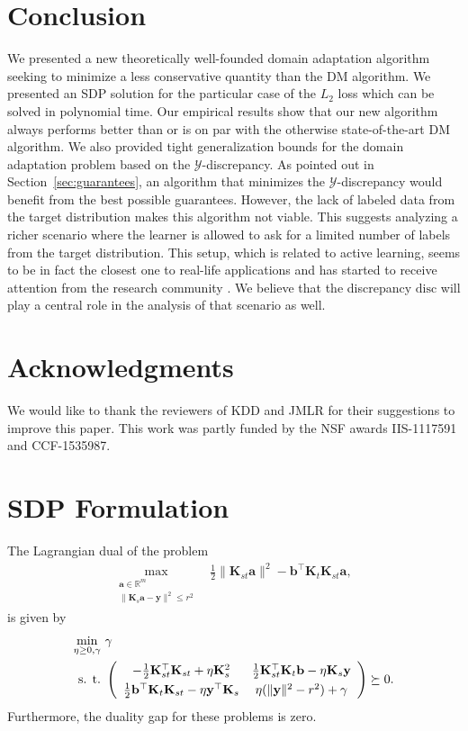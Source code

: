 \documentclass[twoside,11pt]{article}
\def\Rset{\mathbb{R}}
\newcommand{\cY}{{\mathcal Y}}
\newcommand{\mat}[1]{{\mathbf #1}}
\renewcommand{\a}{\mat{a}}
\renewcommand{\b}{\mat{b}}
\newcommand{\1}{\mat{1}}
\newcommand{\Ks}{\mat{K}_s}
\newcommand{\Kst}{\mat{K}_{st}}
\newcommand{\Kt}{\mat{K}_{t}}
\newcommand{\y}{\mat{y}}
\newcommand{\dis}{\mathrm{disc}}
\begin{document}
\section{Conclusion}

We presented a new theoretically well-founded domain adaptation
algorithm seeking to minimize a less conservative quantity than the DM
algorithm. We presented an SDP solution for the particular case of the
$L_2$ loss which can be solved in polynomial time. Our empirical
results show that our new algorithm always performs better than or is
on par with the otherwise state-of-the-art DM algorithm. We also
provided tight generalization bounds for the domain adaptation problem
based on the $\cY$-discrepancy. As pointed out in
Section~\ref{sec:guarantees}, an algorithm that minimizes the
$\cY$-discrepancy would benefit from the best possible
guarantees. However, the lack of labeled data from the target
distribution makes this algorithm not viable. This suggests analyzing
a richer scenario where the learner is allowed to ask for a limited
number of labels from the target distribution. This setup, which is
related to active learning, seems to be in fact the closest one to
real-life applications and has started to receive attention from the
research community \citep{Berlind}. We believe that the discrepancy $\dis$ will
play a central role in the analysis of that scenario as well.

\section*{Acknowledgments}
We would like to thank the reviewers of KDD and JMLR for their
suggestions to improve this paper. This work was partly funded by the
NSF awards IIS-1117591 and CCF-1535987.

\appendix

\section{SDP Formulation}
\label{app:sdpdual}

\begin{lemma}
The Lagrangian dual of the problem
\begin{align}
\label{eq:maxprob2}
  \max_{\substack{\a \in \Rset^m \\ \|\Ks \a - \y\|^2 \leq r^2}}
& \ \frac{1}{2}\|\Kst \a\|^2 - \b^\top \Kt \Kst \a,
\end{align}
is given by
\begin{align*}
\min_{\eta \geq 0, \gamma} & \ \gamma \\
\text{s. t.} & \ \left(
\def\arraystretch{1.3}
\begin{array}{cc}
 -\frac{1}{2} \Kst^\top \Kst + \eta \Ks^2
& \frac{1}{2}\Kst^\top \Kt \b - \eta \Ks\y  \\
\frac{1}{2} \b^\top  \Kt \Kst - \eta \y^\top \Ks
&  \eta (\|\y\|^2 - r^2) + \gamma
\end{array}
\right) \succeq  0.
\end{align*}
Furthermore, the duality gap for these problems is zero.
\end{lemma}
\end{document}
